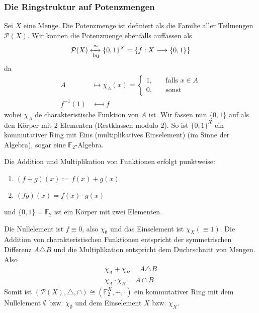 \subsubsection{Die Ringstruktur auf Potenzmengen}
Sei $X$ eine Menge. Die Potenzmenge ist definiert als die Familie aller Teilmengen $\mathcal{P}(X)$. Wir können die Potenzmenge ebenfalls auffassen als
\begin{equation}
\mathcal{P}(X) \xleftrightarrow[\text{bij}]{\cong} \{0,1\}^X = \{f:X \longrightarrow \{0,1\}\}
\end{equation}
da
\begin{subequations} 
\begin{align}
A &\longmapsto \chi_A(x) = \begin{cases}
1, \quad & \text{falls } x\in A\\
0, \quad & \text{sonst}
\end{cases}\\
f^{-1}(1) & \longmapsfrom f
\end{align}
\end{subequations}
wobei $\chi_A$ de charakteristische Funktion von $A$ ist. \newline \newline
Wir fassen nun $\{0,1\}$ auf als den Körper mit 2 Elementen (Restklassen modulo 2). So ist $\{0,1\}^X$ ein kommutativer Ring mit Eins (multiplikatives Einselement) (im Sinne der Algebra), sogar eine $\mathbb{F}_2$-Algebra.
\begin{remark} Die Addition und Multiplikation von Funktionen erfolgt punktweise:
\begin{enumerate} [-, itemsep=0pt,topsep=3pt]
\item  $(f+g)(x) := f(x)+g(x)$ 
\item $(fg)(x)= f(x) \cdot g(x)$
\end{enumerate}
und $\{0,1\} = \mathbb{F}_2$ ist ein Körper mit zwei Elementen.
\end{remark}
Die Nullelement ist $f \equiv 0$, also $\chi_\emptyset$ und das Einselement ist $\chi_X (\equiv 1)$. Die Addition von charakteristischen Funktionen entspricht der symmetrischen Differenz $A \triangle B$ und die Multiplikation entspricht dem Duchrschnitt von Mengen. Also
\begin{subequations}
\begin{align}
\chi_A + \chi_B = A \triangle B \\
\chi_A \cdot \chi_B = A \cap B
\end{align}
\end{subequations}
Somit ist $(\mathcal{P}(X), \triangle, \cap) \cong (\mathbb{F}_2^X, +, \cdot)$ ein kommutativer Ring mit dem Nullelement $\emptyset$ bzw. $\chi_\emptyset$ und dem Einselement $X$ bzw. $\chi_X$. 
